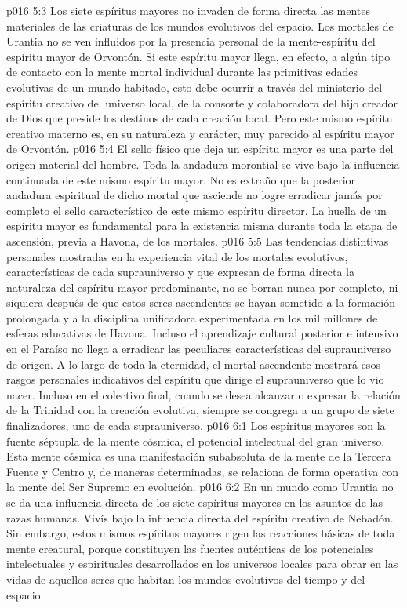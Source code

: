 \vs p016 5:3 Los siete espíritus mayores no invaden de forma directa las mentes materiales de las criaturas de los mundos evolutivos del espacio. Los mortales de Urantia no se ven influidos por la presencia personal de la mente\hyp{}espíritu del espíritu mayor de Orvontón. Si este espíritu mayor llega, en efecto, a algún tipo de contacto con la mente mortal individual durante las primitivas edades evolutivas de un mundo habitado, esto debe ocurrir a través del ministerio del espíritu creativo del universo local, de la consorte y colaboradora del hijo creador de Dios que preside los destinos de cada creación local. Pero este mismo espíritu creativo materno es, en su naturaleza y carácter, muy parecido al espíritu mayor de Orvontón.
\vs p016 5:4 El sello físico que deja un espíritu mayor es una parte del origen material del hombre. Toda la andadura morontial se vive bajo la influencia continuada de este mismo espíritu mayor. No es extraño que la posterior andadura espiritual de dicho mortal que asciende no logre erradicar jamás por completo el sello característico de este mismo espíritu director. La huella de un espíritu mayor es fundamental para la existencia misma durante toda la etapa de ascensión, previa a Havona, de los mortales.
\vs p016 5:5 Las tendencias distintivas personales mostradas en la experiencia vital de los mortales evolutivos, características de cada suprauniverso y que expresan de forma directa la naturaleza del espíritu mayor predominante, no se borran nunca por completo, ni siquiera después de que estos seres ascendentes se hayan sometido a la formación prolongada y a la disciplina unificadora experimentada en los mil millones de esferas educativas de Havona. Incluso el aprendizaje cultural posterior e intensivo en el Paraíso no llega a erradicar las peculiares características del suprauniverso de origen. A lo largo de toda la eternidad, el mortal ascendente mostrará esos rasgos personales indicativos del espíritu que dirige el suprauniverso que lo vio nacer. Incluso en el colectivo final, cuando se desea alcanzar o expresar  la relación de la Trinidad con la creación evolutiva, siempre se congrega a un grupo de siete finalizadores, uno de cada suprauniverso.
\vs p016 6:1 Los espíritus mayores son la fuente séptupla de la mente cósmica, el potencial intelectual del gran universo. Esta mente cósmica es una manifestación subabsoluta de la mente de la Tercera Fuente y Centro y, de maneras determinadas, se relaciona de forma operativa con la mente del Ser Supremo en evolución.
\vs p016 6:2 En un mundo como Urantia no se da una influencia directa de los siete espíritus mayores en los asuntos de las razas humanas. Vivís bajo la influencia directa del espíritu creativo de Nebadón. Sin embargo, estos mismos espíritus mayores rigen las reacciones básicas de toda mente creatural, porque constituyen las fuentes auténticas de los potenciales intelectuales y espirituales desarrollados en los universos locales para obrar en las vidas de aquellos seres que habitan los mundos evolutivos del tiempo y del espacio.
